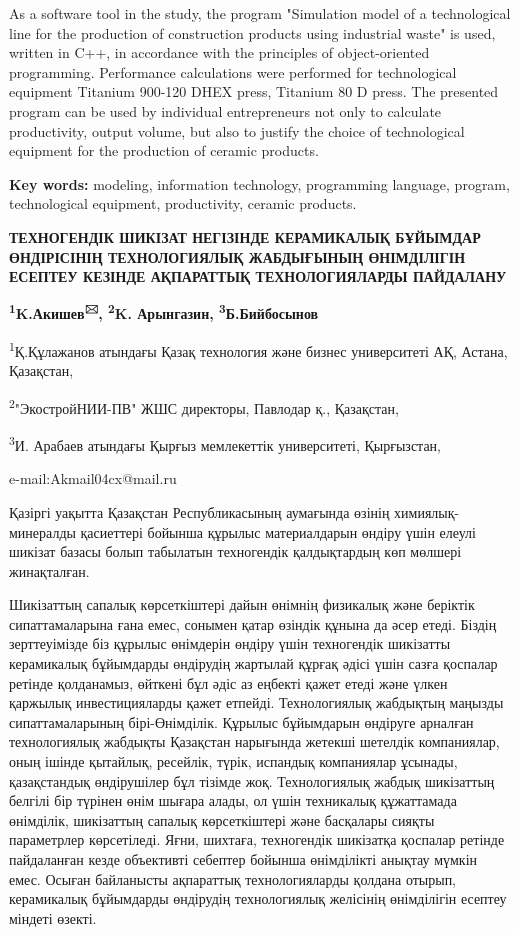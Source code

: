 As a software tool in the study, the program "Simulation model of a
technological line for the production of construction products using
industrial waste" is used, written in C++, in accordance with the
principles of object-oriented programming. Performance calculations were
performed for technological equipment Titanium 900-120 DHEX press,
Titanium 80 D press. The presented program can be used by individual
entrepreneurs not only to calculate productivity, output volume, but
also to justify the choice of technological equipment for the production
of ceramic products.

{\bfseries Key words:} modeling, information technology, programming
language, program, technological equipment, productivity, ceramic
products.
\begin{center}

{\bfseries ТЕХНОГЕНДІК ШИКІЗАТ НЕГІЗІНДЕ КЕРАМИКАЛЫҚ БҰЙЫМДАР ӨНДІРІСІНІҢ ТЕХНОЛОГИЯЛЫҚ ЖАБДЫҒЫНЫҢ ӨНІМДІЛІГІН ЕСЕПТЕУ КЕЗІНДЕ АҚПАРАТТЫҚ ТЕХНОЛОГИЯЛАРДЫ ПАЙДАЛАНУ}

{\bfseries \textsuperscript{1}K.Акишев\textsuperscript{🖂},
\textsuperscript{2}K. Арынгазин, \textsuperscript{3}Б.Бийбосынов}

\textsuperscript{1}Қ.Құлажанов атындағы Қазақ технология және бизнес
университеті АҚ, Астана, Қазақстан,

\textsuperscript{2}"ЭкостройНИИ-ПВ" ЖШС директоры, Павлодар қ.,
Қазақстан,

\textsuperscript{3}И. Арабаев атындағы Қырғыз мемлекеттік университеті,
Қырғызстан,

e-mail:Akmail04cx@mail.ru
\end{center}

Қазіргі уақытта Қазақстан Республикасының аумағында өзінің
химиялық-минералды қасиеттері бойынша құрылыс материалдарын өндіру үшін
елеулі шикізат базасы болып табылатын техногендік қалдықтардың көп
мөлшері жинақталған.

Шикізаттың сапалық көрсеткіштері дайын өнімнің физикалық және беріктік
сипаттамаларына ғана емес, сонымен қатар өзіндік құнына да әсер етеді.
Біздің зерттеуімізде біз құрылыс өнімдерін өндіру үшін техногендік
шикізатты керамикалық бұйымдарды өндірудің жартылай құрғақ әдісі үшін
сазға қоспалар ретінде қолданамыз, өйткені бұл әдіс аз еңбекті қажет
етеді және үлкен қаржылық инвестицияларды қажет етпейді. Технологиялық
жабдықтың маңызды сипаттамаларының бірі-Өнімділік. Құрылыс бұйымдарын
өндіруге арналған технологиялық жабдықты Қазақстан нарығында жетекші
шетелдік компаниялар, оның ішінде қытайлық, ресейлік, түрік, испандық
компаниялар ұсынады, қазақстандық өндірушілер бұл тізімде жоқ.
Технологиялық жабдық шикізаттың белгілі бір түрінен өнім шығара алады,
ол үшін техникалық құжаттамада өнімділік, шикізаттың сапалық
көрсеткіштері және басқалары сияқты параметрлер көрсетіледі. Яғни,
шихтаға, техногендік шикізатқа қоспалар ретінде пайдаланған кезде
объективті себептер бойынша өнімділікті анықтау мүмкін емес. Осыған
байланысты ақпараттық технологияларды қолдана отырып, керамикалық
бұйымдарды өндірудің технологиялық желісінің өнімділігін есептеу міндеті
өзекті.

